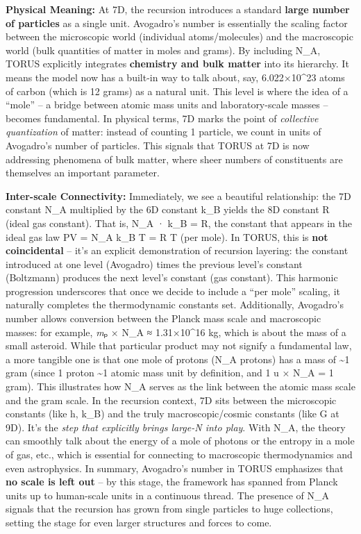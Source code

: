 \documentclass[]{article}
\begin{document}
\textbf{Physical Meaning:} At 7D, the recursion introduces a standard
\textbf{large number of particles} as a single unit. Avogadro's number
is essentially the scaling factor between the microscopic world
(individual atoms/molecules) and the macroscopic world (bulk quantities
of matter in moles and grams)​. By including N\_A, TORUS explicitly
integrates \textbf{chemistry and bulk matter} into its hierarchy. It
means the model now has a built-in way to talk about, say,
6.022×10\^{}23 atoms of carbon (which is 12 grams) as a natural unit.
This level is where the idea of a ``mole'' -- a bridge between atomic
mass units and laboratory-scale masses -- becomes fundamental. In
physical terms, 7D marks the point of \emph{collective quantization} of
matter: instead of counting 1 particle, we count in units of Avogadro's
number of particles. This signals that TORUS at 7D is now addressing
phenomena of bulk matter, where sheer numbers of constituents are
themselves an important parameter.

\textbf{Inter-scale Connectivity:} Immediately, we see a beautiful
relationship: the 7D constant N\_A multiplied by the 6D constant k\_B
yields the 8D constant R (ideal gas constant)​. That is, N\_A · k\_B =
R, the constant that appears in the ideal gas law PV = N\_A k\_B T = R T
(per mole). In TORUS, this is \textbf{not coincidental} -- it's an
explicit demonstration of recursion layering: the constant introduced at
one level (Avogadro) times the previous level's constant (Boltzmann)
produces the next level's constant (gas constant)​. This harmonic
progression underscores that once we decide to include a ``per mole''
scaling, it naturally completes the thermodynamic constants set.
Additionally, Avogadro's number allows conversion between the Planck
mass scale and macroscopic masses: for example, \emph{m}ₚ × N\_A ≈
1.31×10\^{}16 kg​, which is about the mass of a small asteroid. While
that particular product may not signify a fundamental law, a more
tangible one is that one mole of protons (N\_A protons) has a mass of
\textasciitilde{}1 gram (since 1 proton \textasciitilde{}1 atomic mass
unit by definition, and 1 u × N\_A = 1 gram). This illustrates how N\_A
serves as the link between the atomic mass scale and the gram scale​. In
the recursion context, 7D sits between the microscopic constants (like
h, k\_B) and the truly macroscopic/cosmic constants (like G at 9D). It's
the \emph{step that explicitly brings large-N into play}. With N\_A, the
theory can smoothly talk about the energy of a mole of photons or the
entropy in a mole of gas, etc., which is essential for connecting to
macroscopic thermodynamics and even astrophysics. In summary, Avogadro's
number in TORUS emphasizes that \textbf{no scale is left out} -- by this
stage, the framework has spanned from Planck units up to human-scale
units in a continuous thread​. The presence of N\_A signals that the
recursion has grown from single particles to huge collections, setting
the stage for even larger structures and forces to come.
\end{document}
